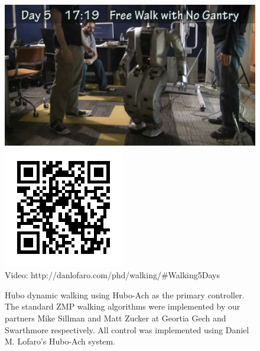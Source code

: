 \begin{figure}[thpb]
  \centering
      \includegraphics[width=0.6\columnwidth]{./examples/pix/dynamicwalking.png}
      \includegraphics[width=0.3\columnwidth]{./qrcode/qrcode-dynamicwalking.png}\\
      Video: http://danlofaro.com/phd/walking/\#Walking5Days
\caption{Hubo dynamic walking using Hubo-Ach as the primary controller.  The standard ZMP walking algorithms were implemented by our partners Mike Sillman and Matt Zucker at Geortia Gech and Swarthmore respectively.  All control was implemented using Daniel M. Lofaro's Hubo-Ach system.}
  \label{fig:dynamicwalking}
\end{figure}










